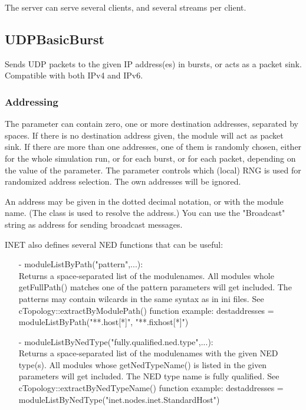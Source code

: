 The server can serve several clients, and several streams per client.


\subsection{UDPBasicBurst}

Sends UDP packets to the given IP address(es) in bursts, or acts as a
packet sink. Compatible with both IPv4 and IPv6.

\subsubsection*{Addressing}

The  parameter can contain zero, one or more destination
addresses, separated by spaces. If there is no destination address given,
the module will act as packet sink. If there are more than one addresses,
one of them is randomly chosen, either for the whole simulation run,
or for each burst, or for each packet, depending on the value of the
 parameter. The  parameter controls which
(local) RNG is used for randomized address selection.
The own addresses will be ignored.

An address may be given in the dotted decimal notation, or with the module
name. (The  class is used to resolve the address.)
You can use the "Broadcast" string as address for sending broadcast messages.

INET also defines several NED functions that can be useful:
\begin{itemize}
\item[-] moduleListByPath("pattern",...): \\
         Returns a space-separated list of the modulenames.
         All modules whole getFullPath() matches one of the pattern parameters will get included.
         The patterns may contain wilcards in the same syntax as in ini files.
         See cTopology::extractByModulePath() function
         example: destaddresses = moduleListByPath("**.host[*]", "**.fixhost[*]")
\item[-] moduleListByNedType("fully.qualified.ned.type",...): \\
         Returns a space-separated list of the modulenames with the given NED type(s).
         All modules whose getNedTypeName() is listed in the given parameters will get included.
         The NED type name is fully qualified.
         See cTopology::extractByNedTypeName() function
         example: destaddresses = moduleListByNedType("inet.nodes.inet.StandardHost")
\end{itemize}

